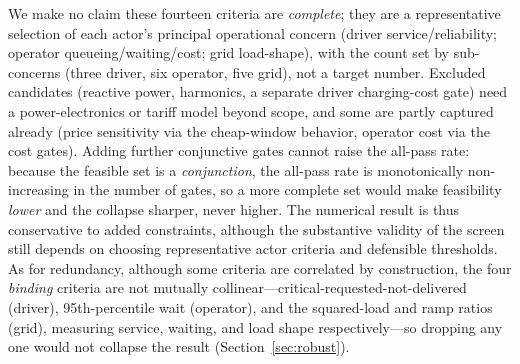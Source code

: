 \documentclass[12pt]{article}
\begin{document}
We make no claim these fourteen criteria are \emph{complete}; they are a representative selection of each actor's principal operational concern (driver service/reliability; operator queueing/waiting/cost; grid load-shape), with the count set by sub-concerns (three driver, six operator, five grid), not a target number. Excluded candidates (reactive power, harmonics, a separate driver charging-cost gate) need a power-electronics or tariff model beyond scope, and some are partly captured already (price sensitivity via the cheap-window behavior, operator cost via the cost gates). Adding further conjunctive gates cannot raise the all-pass rate: because the feasible set is a \emph{conjunction}, the all-pass rate is monotonically non-increasing in the number of gates, so a more complete set would make feasibility \emph{lower} and the collapse sharper, never higher. The numerical result is thus conservative to added constraints, although the substantive validity of the screen still depends on choosing representative actor criteria and defensible thresholds. As for redundancy, although some criteria are correlated by construction, the four \emph{binding} criteria are not mutually collinear---critical-requested-not-delivered (driver), 95th-percentile wait (operator), and the squared-load and ramp ratios (grid), measuring service, waiting, and load shape respectively---so dropping any one would not collapse the result (Section~\ref{sec:robust}).
\end{document}
